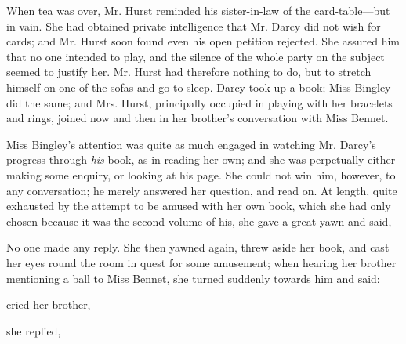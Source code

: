 When tea was over, Mr. Hurst reminded his sister-in-law of the card-table---but in vain. She had obtained private intelligence that Mr. Darcy did not wish for cards; and Mr. Hurst soon found even his open petition rejected. She assured him that no one intended to play, and the silence of the whole party on the subject seemed to justify her. Mr. Hurst had therefore nothing to do, but to stretch himself on one of the sofas and go to sleep. Darcy took up a book; Miss Bingley did the same; and Mrs. Hurst, principally occupied in playing with her bracelets and rings, joined now and then in her brother's conversation with Miss Bennet.

Miss Bingley's attention was quite as much engaged in watching Mr. Darcy's progress through {\em his} book, as in reading her own; and she was perpetually either making some enquiry, or looking at his page. She could not win him, however, to any conversation; he merely answered her question, and read on. At length, quite exhausted by the attempt to be amused with her own book, which she had only chosen because it was the second volume of his, she gave a great yawn and said, 

No one made any reply. She then yawned again, threw aside her book, and cast her eyes round the room in quest for some amusement; when hearing her brother mentioning a ball to Miss Bennet, she turned suddenly towards him and said:


 cried her brother, 

 she replied, 

